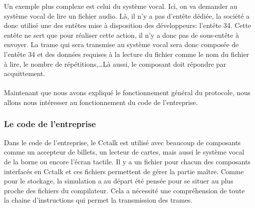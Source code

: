\documentclass[a4paper]{article}
\begin{document}
Un exemple plus complexe est celui du système vocal. Ici, on va demander au
système vocal de lire un fichier audio. Là, il n'y a pas d'entête dédiée, la
société a donc utilisé une des entêtes mise à disposition des développeurs:
l'entête 34. Cette entête ne sert que pour réaliser cette action, il n'y a donc
pas de sous-entête à envoyer. La trame qui sera transmise au système vocal sera
donc composée de l'entête 34 et des données requises à la lecture du fichier
comme le nom du fichier à lire, le nombre de répétitions,\dots Là aussi, le
composant doit répondre par acquittement.
\\~\\

Maintenant que nous avons expliqué le fonctionnement général du protocole, nous
allons nous intéresser au fonctionnement du code de l'entreprise.

\subsubsection{Le code de l'entreprise}

Dans le code de l'entreprise, le Cctalk est utilisé avec beaucoup de composants
comme un accepteur de billets, un lecteur de cartes, mais aussi le système vocal
de la borne ou encore l'écran tactile. Il y a un fichier pour chacun des
composants interfacés en Cctalk et ces fichiers permettent de gérer la partie
maître. Comme pour le stockage, la simulation a au départ été pensée pour se
situer au plus proche des fichiers du compilateur. Cela a nécessité une
compréhension de toute la chaine d'instructions qui permet la transmission des
trames.
\end{document}
